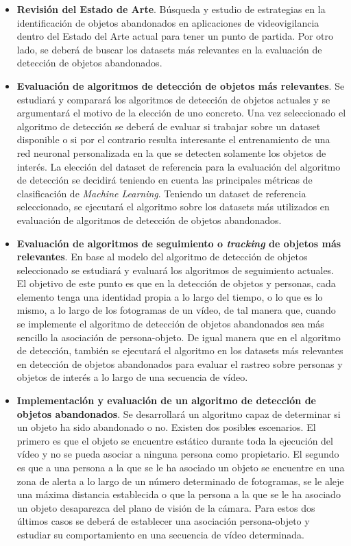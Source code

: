 \begin{itemize}
    \item \textbf{Revisión del Estado de Arte}. Búsqueda y estudio de estrategias en la identificación de objetos abandonados en aplicaciones de videovigilancia dentro del Estado del Arte actual para tener un punto de partida. Por otro lado, se deberá de buscar los datasets más relevantes en la evaluación de detección de objetos abandonados.
    \item \textbf{Evaluación de algoritmos de detección de objetos más relevantes}. Se estudiará y comparará los algoritmos de detección de objetos actuales y se argumentará el motivo de la elección de uno concreto. Una vez seleccionado el algoritmo de detección se deberá de evaluar si trabajar sobre un dataset disponible o si por el contrario resulta interesante el entrenamiento de una red neuronal personalizada en la que se detecten solamente los objetos de interés. La elección del dataset de referencia para la evaluación del algoritmo de detección se decidirá teniendo en cuenta las principales métricas de clasificación de \textit{Machine Learning}. Teniendo un dataset de referencia seleccionado, se ejecutará el algoritmo sobre los datasets más utilizados en evaluación de algoritmos de detección de objetos abandonados.
    \item \textbf{Evaluación de algoritmos de seguimiento o \textit{tracking} de objetos más relevantes}. En base al modelo del algoritmo de detección de objetos seleccionado se estudiará y evaluará los algoritmos de seguimiento actuales. El objetivo de este punto es que en la detección de objetos y personas, cada elemento tenga una identidad propia a lo largo del tiempo, o lo que es lo mismo, a lo largo de los fotogramas de un vídeo, de tal manera que, cuando se implemente el algoritmo de detección de objetos abandonados sea más sencillo la asociación de persona-objeto. De igual manera que en el algoritmo de detección, también se ejecutará el algoritmo en los datasets más relevantes en detección de objetos abandonados para evaluar el rastreo sobre personas y objetos de interés a lo largo de una secuencia de vídeo.
    \item \textbf{Implementación y evaluación de un algoritmo de detección de objetos abandonados}. Se desarrollará un algoritmo capaz de determinar si un objeto ha sido abandonado o no. Existen dos posibles escenarios. El primero es que el objeto se encuentre estático durante toda la ejecución del vídeo y no se pueda asociar a ninguna persona como propietario. El segundo es que a una persona a la que se le ha asociado un objeto se encuentre en una zona de alerta a lo largo de un número determinado de fotogramas, se le aleje una máxima distancia establecida o que la persona a la que se le ha asociado un objeto desaparezca del plano de visión de la cámara. Para estos dos últimos casos se deberá de establecer una asociación persona-objeto y estudiar su comportamiento en una secuencia de vídeo determinada.
\end{itemize}

